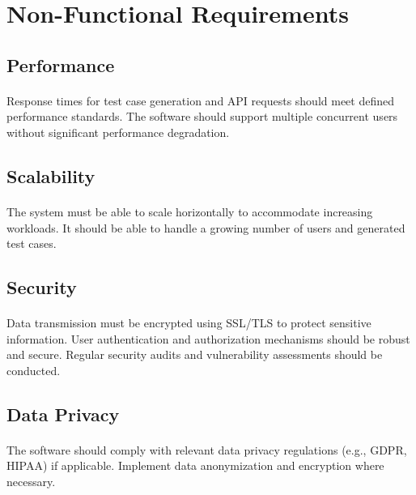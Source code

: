 \documentclass{article}
\begin{document}

\section{Non-Functional Requirements}
\subsection{Performance}
\paragraph{}
Response times for test case generation and API requests should meet defined performance
standards. The software should support multiple concurrent users without significant
performance degradation.

\subsection{Scalability}
\paragraph{}
The system must be able to scale horizontally to accommodate increasing workloads.
It should be able to handle a growing number of users and generated test cases.

\subsection{Security}
\paragraph{}
Data transmission must be encrypted using SSL/TLS to protect sensitive information.
User authentication and authorization mechanisms should be robust and secure.
Regular security audits and vulnerability assessments should be conducted.

\subsection{Data Privacy}
\paragraph{}
The software should comply with relevant data privacy regulations (e.g., GDPR, HIPAA) if applicable.
Implement data anonymization and encryption where necessary.
\end{document}
